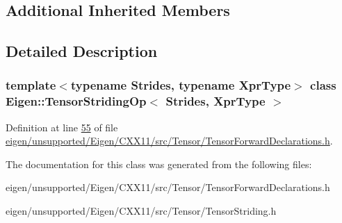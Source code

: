 \subsection*{Additional Inherited Members}


\subsection{Detailed Description}
\subsubsection*{template$<$typename Strides, typename Xpr\+Type$>$\newline
class Eigen\+::\+Tensor\+Striding\+Op$<$ Strides, Xpr\+Type $>$}



Definition at line \hyperlink{eigen_2unsupported_2_eigen_2_c_x_x11_2src_2_tensor_2_tensor_forward_declarations_8h_source_l00055}{55} of file \hyperlink{eigen_2unsupported_2_eigen_2_c_x_x11_2src_2_tensor_2_tensor_forward_declarations_8h_source}{eigen/unsupported/\+Eigen/\+C\+X\+X11/src/\+Tensor/\+Tensor\+Forward\+Declarations.\+h}.



The documentation for this class was generated from the following files\+:\begin{DoxyCompactItemize}
\item 
eigen/unsupported/\+Eigen/\+C\+X\+X11/src/\+Tensor/\+Tensor\+Forward\+Declarations.\+h\item 
eigen/unsupported/\+Eigen/\+C\+X\+X11/src/\+Tensor/\+Tensor\+Striding.\+h\end{DoxyCompactItemize}
